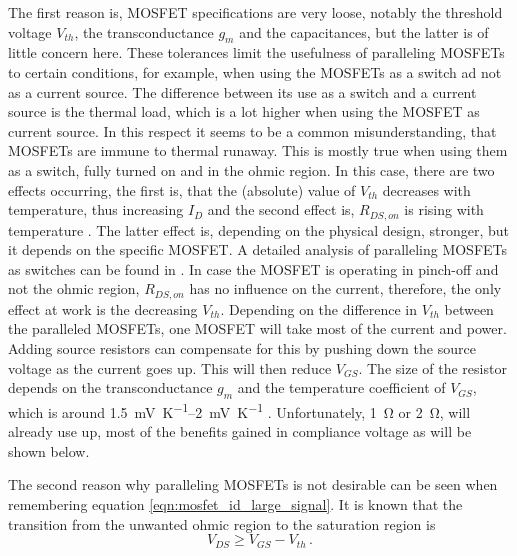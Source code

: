The first reason is, MOSFET specifications are very loose, notably the threshold voltage $V_{th}$, the transconductance $g_m$ and the capacitances, but the latter is of little concern here. These tolerances limit the usefulness of paralleling MOSFETs to certain conditions, for example, when using the MOSFETs as a switch ad not as a current source. The difference between its use as a switch and a current source is the thermal load, which is a lot higher when using the MOSFET as current source. In this respect it seems to be a common misunderstanding, that MOSFETs are immune to thermal runaway. This is mostly true when using them as a switch, fully turned on and in the ohmic region. In this case, there are two effects occurring, the first is, that the (absolute) value of $V_{th}$ decreases with temperature, thus increasing $I_D$ and the second effect is, $R_{DS,on}$ is rising with temperature \cite{mosfet_thermal_runaway}. The latter effect is, depending on the physical design, stronger, but it depends on the specific MOSFET. A detailed analysis of paralleling MOSFETs as switches can be found in \cite{paralleling_mosfets}. In case the MOSFET is operating in pinch-off and not the ohmic region, $R_{DS,on}$ has no influence on the current, therefore, the only effect at work is the decreasing $V_{th}$. Depending on the difference in $V_{th}$ between the paralleled MOSFETs, one MOSFET will take most of the current and power. Adding source resistors can compensate for this by pushing down the source voltage as the current goes up. This will then reduce $V_{GS}$. The size of the resistor depends on the transconductance $g_m$ and the temperature coefficient of $V_{GS}$, which is around \qtyrange[range-units = single]{1.5}{2}{\mV \per \K} \cite{mosfet_vgs_tempco}. Unfortunately, \qty{1}{\ohm} or \qty{2}{\ohm}, will already use up, most of the benefits gained in compliance voltage as will be shown below.

The second reason why paralleling MOSFETs is not desirable can be seen when
remembering equation \ref{eqn:mosfet_id_large_signal}. It is known that the transition from the unwanted ohmic region to the saturation region is
\begin{equation}
    V_{DS} \geq V_{GS} − V_{th}\,.
\end{equation}


